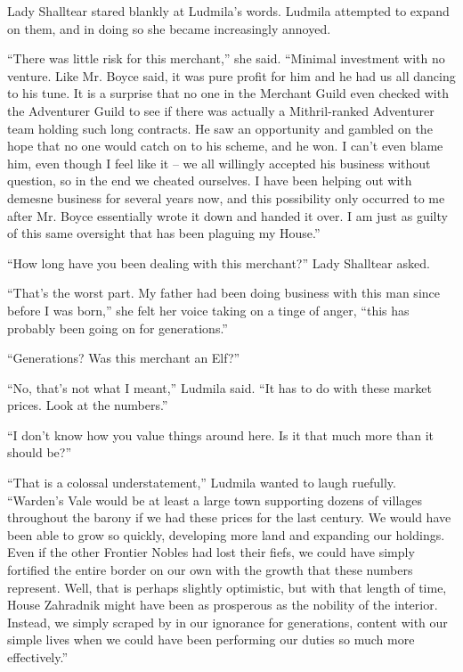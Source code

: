  

Lady Shalltear stared blankly at Ludmila’s words. Ludmila attempted to expand on them, and in doing so she became increasingly annoyed.

 

“There was little risk for this merchant,” she said. “Minimal investment with no venture. Like Mr. Boyce said, it was pure profit for him and he had us all dancing to his tune. It is a surprise that no one in the Merchant Guild even checked with the Adventurer Guild to see if there was actually a Mithril-ranked Adventurer team holding such long contracts. He saw an opportunity and gambled on the hope that no one would catch on to his scheme, and he won. I can’t even blame him, even though I feel like it – we all willingly accepted his business without question, so in the end we cheated ourselves. I have been helping out with demesne business for several years now, and this possibility only occurred to me after Mr. Boyce essentially wrote it down and handed it over. I am just as guilty of this same oversight that has been plaguing my House.”

 

“How long have you been dealing with this merchant?” Lady Shalltear asked.

 

“That’s the worst part. My father had been doing business with this man since before I was born,” she felt her voice taking on a tinge of anger, “this has probably been going on for generations.”

 

“Generations? Was this merchant an Elf?”

 

“No, that’s not what I meant,” Ludmila said. “It has to do with these market prices. Look at the numbers.”

 

“I don’t know how you value things around here. Is it that much more than it should be?”

 

“That is a colossal understatement,” Ludmila wanted to laugh ruefully. “Warden’s Vale would be at least a large town supporting dozens of villages throughout the barony if we had these prices for the last century. We would have been able to grow so quickly, developing more land and expanding our holdings. Even if the other Frontier Nobles had lost their fiefs, we could have simply fortified the entire border on our own with the growth that these numbers represent. Well, that is perhaps slightly optimistic, but with that length of time, House Zahradnik might have been as prosperous as the nobility of the interior. Instead, we simply scraped by in our ignorance for generations, content with our simple lives when we could have been performing our duties so much more effectively.”

